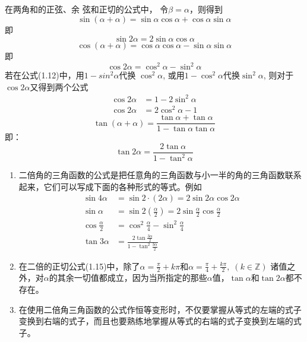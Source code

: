 在两角和的正弦、余
弦和正切的公式中，
令$\beta=\alpha$，则得到
\[\sin(\alpha+\alpha)=\sin\alpha\cos\alpha+\cos\alpha\sin\alpha\]
即
\begin{equation}
    \sin2\alpha=2\sin\alpha\cos\alpha
\end{equation}
\[\cos(\alpha+\alpha)=\cos\alpha\cos\alpha-\sin\alpha\sin\alpha\]
即
\begin{equation}
    \cos2\alpha=\cos^2\alpha-\sin^2\alpha
\end{equation}
若在公式(1.12)中，用$1-sin^2\alpha$代换 $\cos^2\alpha$, 或用$1-\cos^2\alpha$代换$\sin^2\alpha$, 则对于$\cos2\alpha$又得到两个公式
\begin{align}
    \cos2\alpha&=1-2\sin^2\alpha\\
    \cos2\alpha&=2\cos^2\alpha-1 
\end{align}
\[\tan (\alpha+\alpha)=\frac{\tan\alpha+\tan\alpha}{1-\tan\alpha\tan\alpha}\]
即：
\begin{equation}
    \tan2\alpha=\frac{2\tan\alpha}{1-\tan^2\alpha}
\end{equation}

\begin{rmk}
\begin{enumerate}
    \item 二倍角的三角函数的公式是把任意角的三角函数与小一半的角的三角函数联系起来，它们可以写成下面的各种形式的等式。例如
\[\begin{split}
    \sin4\alpha&=\sin2\cdot (2\alpha) =2\sin2\alpha\cos2\alpha\\
    \sin\alpha&=\sin2\left(\frac{\alpha}{2}\right)=2\sin\frac{\alpha}{2}\cos \frac{\alpha}{2}\\
    \cos\frac{\alpha}{2}&=\cos^2\frac{\alpha}{4}-\sin^2\frac{\alpha}{4}\\
    \tan3\alpha&=\frac{2\tan\frac{3\alpha}{2}}{1-\tan^2\frac{3\alpha}{2}}
\end{split}\]

\item 在二倍的正切公式(1.15)中，除了$\alpha=\frac{\pi}{2}+k\pi$和$\alpha=\frac{\pi}{4}+\frac{k\pi}{2},\; (k\in\mathbb{Z})$
诸值之外，对$\alpha$的其余一切值都成立，因为当所指定的那些$\alpha$值，$\tan\alpha$和$\tan2\alpha$都不存在。
\item 在使用二倍角三角函数的公式作恒等变形时，不仅要掌握从等式的左端的式子变换到右端的式子，而且也要熟练地掌握从等式的右端的式子变换到左端的式子。
\end{enumerate}
\end{rmk}


